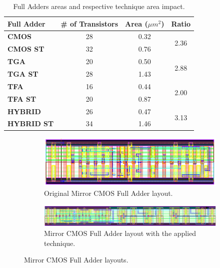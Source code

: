 \documentclass[ecp,tc, english]{iiufrgs}
\begin{document}
\begin{table}[H]
\centering
\caption{Full Adders areas and respective technique area impact.}
\label{penalties}
\begin{tabular}{lccc}
\hline
\textbf{Full Adder} & \multicolumn{1}{l}{\textbf{\# of Transistors}} & \textbf{Area (${\mu m}^2$)} & \textbf{Ratio}        \\ \hline
\textbf{CMOS}       & 28                                              & 0.32             & \multirow{2}{*}{2.36} \\ \cline{1-3}
\textbf{CMOS ST}    & 32                                              & 0.76             &                       \\ \hline
\textbf{TGA}        & 20                                              & 0.50             & \multirow{2}{*}{2.88} \\ \cline{1-3}
\textbf{TGA ST}     & 28                                              & 1.43             &                       \\ \hline
\textbf{TFA}        & 16                                              & 0.44             & \multirow{2}{*}{2.00} \\ \cline{1-3}
\textbf{TFA ST}     & 20                                              & 0.87             &                       \\ \hline
\textbf{HYBRID}     & 26                                              & 0.47             & \multirow{2}{*}{3.13} \\ \cline{1-3}
\textbf{HYBRID ST}  & 34                                              & 1.46             &                       \\ \hline
\end{tabular}
\end{table}

\begin{figure}[H]
  \centering
  \begin{subfigure}{\linewidth}
    \centering
    \includegraphics[width=\linewidth]{CMOS.png}
    \caption{Original Mirror CMOS Full Adder layout.}
  \end{subfigure}

  \begin{subfigure}{\linewidth}
    \centering
    \includegraphics[width=\linewidth]{CMOSST.png}
    \caption{Mirror CMOS Full Adder layout with the applied technique.}
  \end{subfigure}  
  \caption{Mirror CMOS Full Adder layouts.}
 \label{CMOS}
\end{figure}
\end{document}
